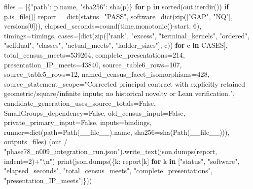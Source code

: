 \documentclass[
  10pt,
  letterpaper,
]{article}
\newenvironment{Shaded}{}{}
\newcommand{\BuiltInTok}[1]{\textcolor[rgb]{0.00,0.50,0.00}{#1}}
\newcommand{\CharTok}[1]{\textcolor[rgb]{0.25,0.44,0.63}{#1}}
\newcommand{\ControlFlowTok}[1]{\textcolor[rgb]{0.00,0.44,0.13}{\textbf{#1}}}
\newcommand{\DecValTok}[1]{\textcolor[rgb]{0.25,0.63,0.44}{#1}}
\newcommand{\KeywordTok}[1]{\textcolor[rgb]{0.00,0.44,0.13}{\textbf{#1}}}
\newcommand{\NormalTok}[1]{#1}
\newcommand{\OperatorTok}[1]{\textcolor[rgb]{0.40,0.40,0.40}{#1}}
\newcommand{\StringTok}[1]{\textcolor[rgb]{0.25,0.44,0.63}{#1}}
\newcommand{\VariableTok}[1]{\textcolor[rgb]{0.10,0.09,0.49}{#1}}
\begin{document}
\begin{Shaded}
\begin{Highlighting}[]
\NormalTok{    files }\OperatorTok{=}\NormalTok{ [\{}\StringTok{"path"}\NormalTok{: p.name, }\StringTok{"sha256"}\NormalTok{: sha(p)\} }\ControlFlowTok{for}\NormalTok{ p }\KeywordTok{in} \BuiltInTok{sorted}\NormalTok{(out.iterdir()) }\ControlFlowTok{if}\NormalTok{ p.is\_file()]}
\NormalTok{    report }\OperatorTok{=} \BuiltInTok{dict}\NormalTok{(status}\OperatorTok{=}\StringTok{"PASS"}\NormalTok{, software}\OperatorTok{=}\BuiltInTok{dict}\NormalTok{(}\BuiltInTok{zip}\NormalTok{([}\StringTok{"GAP"}\NormalTok{, }\StringTok{"NQ"}\NormalTok{], versions[}\DecValTok{0}\NormalTok{])), elapsed\_seconds}\OperatorTok{=}\BuiltInTok{round}\NormalTok{(time.monotonic()}\OperatorTok{{-}}\NormalTok{start, }\DecValTok{6}\NormalTok{), timings}\OperatorTok{=}\NormalTok{timings,}
\NormalTok{        cases}\OperatorTok{=}\NormalTok{[}\BuiltInTok{dict}\NormalTok{(}\BuiltInTok{zip}\NormalTok{([}\StringTok{"rank"}\NormalTok{, }\StringTok{"excess"}\NormalTok{, }\StringTok{"terminal\_kernels"}\NormalTok{, }\StringTok{"ordered"}\NormalTok{, }\StringTok{"selfdual"}\NormalTok{, }\StringTok{"classes"}\NormalTok{, }\StringTok{"actual\_meets"}\NormalTok{, }\StringTok{"ladder\_sizes"}\NormalTok{], c)) }\ControlFlowTok{for}\NormalTok{ c }\KeywordTok{in}\NormalTok{ CASES],}
\NormalTok{        total\_census\_meets}\OperatorTok{=}\DecValTok{539264}\NormalTok{, complete\_presentations}\OperatorTok{=}\DecValTok{214}\NormalTok{, presentation\_IP\_meets}\OperatorTok{=}\DecValTok{43840}\NormalTok{,}
\NormalTok{        source\_table6\_rows}\OperatorTok{=}\DecValTok{107}\NormalTok{, source\_table5\_rows}\OperatorTok{=}\DecValTok{12}\NormalTok{, named\_census\_facet\_isomorphisms}\OperatorTok{=}\DecValTok{428}\NormalTok{,}
\NormalTok{        source\_statement\_scope}\OperatorTok{=}\StringTok{"Corrected principal contract with explicitly retained geometric/square/infinite inputs; no historical novelty or Lean verification."}\NormalTok{,}
\NormalTok{        candidate\_generation\_uses\_source\_totals}\OperatorTok{=}\VariableTok{False}\NormalTok{, SmallGroups\_dependency}\OperatorTok{=}\VariableTok{False}\NormalTok{, old\_census\_input}\OperatorTok{=}\VariableTok{False}\NormalTok{, private\_primary\_input}\OperatorTok{=}\VariableTok{False}\NormalTok{,}
\NormalTok{        inputs}\OperatorTok{=}\NormalTok{bindings, runner}\OperatorTok{=}\BuiltInTok{dict}\NormalTok{(path}\OperatorTok{=}\NormalTok{Path(}\VariableTok{\_\_file\_\_}\NormalTok{).name, sha256}\OperatorTok{=}\NormalTok{sha(Path(}\VariableTok{\_\_file\_\_}\NormalTok{))), outputs}\OperatorTok{=}\NormalTok{files)}
\NormalTok{    (out }\OperatorTok{/} \StringTok{"phase78\_n009\_integration\_run.json"}\NormalTok{).write\_text(json.dumps(report, indent}\OperatorTok{=}\DecValTok{2}\NormalTok{)}\OperatorTok{+}\StringTok{"}\CharTok{\textbackslash{}n}\StringTok{"}\NormalTok{)}
    \BuiltInTok{print}\NormalTok{(json.dumps(\{k: report[k] }\ControlFlowTok{for}\NormalTok{ k }\KeywordTok{in}\NormalTok{ [}\StringTok{"status"}\NormalTok{, }\StringTok{"software"}\NormalTok{, }\StringTok{"elapsed\_seconds"}\NormalTok{, }\StringTok{"total\_census\_meets"}\NormalTok{, }\StringTok{"complete\_presentations"}\NormalTok{, }\StringTok{"presentation\_IP\_meets"}\NormalTok{]\}))}



\end{Highlighting}
\end{Shaded}
\end{document}
